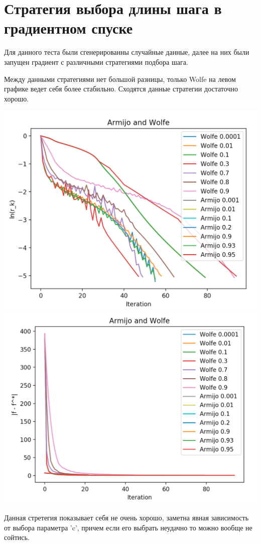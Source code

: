 \documentclass{article}
\theoremstyle{definition}
\theoremstyle{remark}
\begin{document}
\section{Стратегия выбора длины шага в градиентном спуске}
Для данного теста были сгенерированны случайные данные, далее на них были запущен градиент с различными стратегиями подбора шага.

Между данными стратегиями нет большой разницы, только Wolfe на левом графике ведет себя более стабильно. Сходятся данные стратегии достаточно хорошо.

\includegraphics[width=0.6 \textwidth]{51.png}
\includegraphics[width=0.6 \textwidth]{52.png}

Данная стретегия показывает себя не очень хорошо, заметна явная зависимость от выбора параметра 'c', причем если его выбрать неудачно то можно вообще не сойтись.
\end{document}
